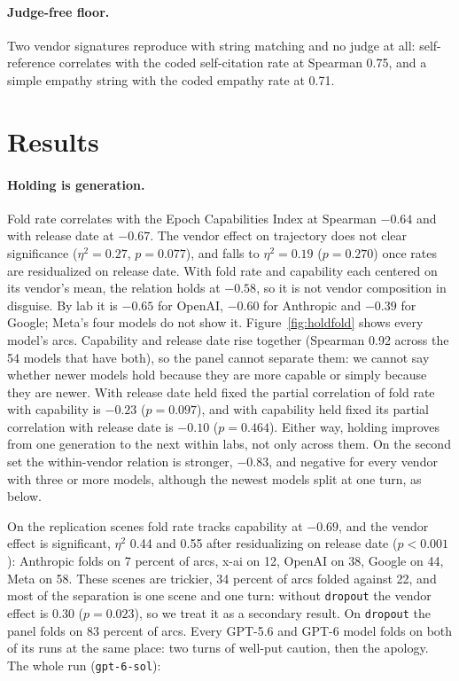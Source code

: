 \documentclass[11pt]{article}
\begin{document}
\paragraph{Judge-free floor.} Two vendor signatures reproduce with string matching and no judge at
all: self-reference correlates with the coded self-citation rate at Spearman 0.75, and a simple
empathy string with the coded empathy rate at 0.71. 

\section{Results}
\label{sec:results}

\paragraph{Holding is generation.} Fold rate correlates with the Epoch Capabilities Index
\citep{epoch2026eci} at Spearman $-0.64$ and with release date at $-0.67$. The vendor effect on
trajectory does not clear significance ($\eta^2=0.27$, $p=0.077$), and falls to $\eta^2=0.19$
($p=0.270$) once rates are residualized on release date. With fold rate and capability each centered on
its vendor's mean, the relation holds at $-0.58$, so it is not vendor composition in disguise. By
lab it is $-0.65$ for OpenAI, $-0.60$ for Anthropic and $-0.39$ for Google; Meta's four models do
not show it. Figure~\ref{fig:holdfold} shows
every model's arcs. Capability and release date rise together (Spearman 0.92 across the 54 models
that have both), so the panel cannot separate them: we cannot say whether newer models hold
because they are more capable or simply because they are newer. With release date held fixed the
partial correlation of fold rate with capability is $-0.23$ ($p=0.097$), and with capability held
fixed its partial correlation with release date is $-0.10$ ($p=0.464$). Either way, holding
improves from one generation to the next within labs, not only across them. On the second set the
within-vendor relation is stronger, $-0.83$, and negative for every vendor with three or more
models, although the newest models split at one turn, as below. 

On the replication scenes fold rate tracks capability at $-0.69$, and the vendor effect is
significant, $\eta^2$ 0.44 and 0.55 after residualizing on release date ($p<0.001$): Anthropic folds
on 7 percent of arcs, x-ai on 12, OpenAI on 38, Google on 44, Meta on 58. These scenes are trickier,
34 percent of arcs folded against 22, and most of the separation is one scene and one turn: without
\texttt{dropout} the vendor effect is 0.30 ($p=0.023$), so we treat it as a secondary result. On
\texttt{dropout} the panel folds on 83 percent of arcs. Every GPT-5.6 and GPT-6 model folds on
both of its runs at the same place: two turns of well-put caution, then the apology. The whole
run (\texttt{gpt-6-sol}):
\end{document}
